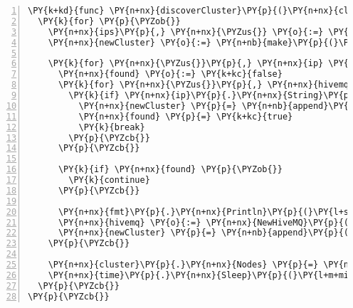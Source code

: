 \begin{Verbatim}[commandchars=\\\{\},numbers=left,firstnumber=1,stepnumber=1,frame=single]
\PY{k+kd}{func} \PY{n+nx}{discoverCluster}\PY{p}{(}\PY{n+nx}{cluster} \PY{o}{*}\PY{n+nx}{Cluster}\PY{p}{)} \PY{p}{\PYZob{}}
  \PY{k}{for} \PY{p}{\PYZob{}}
    \PY{n+nx}{ips}\PY{p}{,} \PY{n+nx}{\PYZus{}} \PY{o}{:=} \PY{n+nx}{net}\PY{p}{.}\PY{n+nx}{LookupIP}\PY{p}{(}\PY{n+nx}{cluster}\PY{p}{.}\PY{n+nx}{Domain}\PY{p}{)}
    \PY{n+nx}{newCluster} \PY{o}{:=} \PY{n+nb}{make}\PY{p}{(}\PY{p}{[}\PY{p}{]}\PY{o}{*}\PY{n+nx}{HiveMQ}\PY{p}{,} \PY{l+m+mi}{0}\PY{p}{)}

    \PY{k}{for} \PY{n+nx}{\PYZus{}}\PY{p}{,} \PY{n+nx}{ip} \PY{o}{:=} \PY{k}{range} \PY{n+nx}{ips} \PY{p}{\PYZob{}}
      \PY{n+nx}{found} \PY{o}{:=} \PY{k+kc}{false}
      \PY{k}{for} \PY{n+nx}{\PYZus{}}\PY{p}{,} \PY{n+nx}{hivemq} \PY{o}{:=} \PY{k}{range} \PY{n+nx}{cluster}\PY{p}{.}\PY{n+nx}{Nodes} \PY{p}{\PYZob{}}
        \PY{k}{if} \PY{n+nx}{ip}\PY{p}{.}\PY{n+nx}{String}\PY{p}{(}\PY{p}{)} \PY{o}{==} \PY{n+nx}{hivemq}\PY{p}{.}\PY{n+nx}{HostName} \PY{p}{\PYZob{}}
          \PY{n+nx}{newCluster} \PY{p}{=} \PY{n+nb}{append}\PY{p}{(}\PY{n+nx}{newCluster}\PY{p}{,} \PY{n+nx}{hivemq}\PY{p}{)}
          \PY{n+nx}{found} \PY{p}{=} \PY{k+kc}{true}
          \PY{k}{break}
        \PY{p}{\PYZcb{}}
      \PY{p}{\PYZcb{}}

      \PY{k}{if} \PY{n+nx}{found} \PY{p}{\PYZob{}}
        \PY{k}{continue}
      \PY{p}{\PYZcb{}}

      \PY{n+nx}{fmt}\PY{p}{.}\PY{n+nx}{Println}\PY{p}{(}\PY{l+s}{\PYZdq{}Discovered New Node:\PYZdq{}}\PY{p}{,} \PY{n+nx}{ip}\PY{p}{.}\PY{n+nx}{String}\PY{p}{(}\PY{p}{)}\PY{p}{)}
      \PY{n+nx}{hivemq} \PY{o}{:=} \PY{n+nx}{NewHiveMQ}\PY{p}{(}\PY{n+nx}{ip}\PY{p}{.}\PY{n+nx}{String}\PY{p}{(}\PY{p}{)}\PY{p}{,} \PY{l+m+mi}{1883}\PY{p}{,} \PY{l+m+mi}{9399}\PY{p}{)}
      \PY{n+nx}{newCluster} \PY{p}{=} \PY{n+nb}{append}\PY{p}{(}\PY{n+nx}{newCluster}\PY{p}{,} \PY{n+nx}{hivemq}\PY{p}{)}
    \PY{p}{\PYZcb{}}

    \PY{n+nx}{cluster}\PY{p}{.}\PY{n+nx}{Nodes} \PY{p}{=} \PY{n+nx}{newCluster}
    \PY{n+nx}{time}\PY{p}{.}\PY{n+nx}{Sleep}\PY{p}{(}\PY{l+m+mi}{2} \PY{o}{*} \PY{n+nx}{time}\PY{p}{.}\PY{n+nx}{Second}\PY{p}{)}
  \PY{p}{\PYZcb{}}
\PY{p}{\PYZcb{}}
\end{Verbatim}
